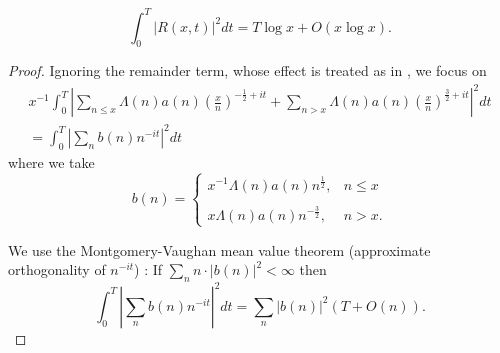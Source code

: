 \documentclass[12pt]{amsart}
\begin{document}
\begin{lem}
 \[
\int_0^T |R(x,t)|^2 dt = T \log x +O(x\log x). 
\]
\end{lem}
\begin{proof}
Ignoring the remainder term, whose effect is treated as in \cite{MontgomeryPC}, we focus on 
\begin{multline*}
x^{-1} \int_0^T \left|  \sum_{n\leq x} \Lambda(n)a(n) \left( \frac{x}{n} \right)^{-\frac 12+it} + \sum_{n>x} \Lambda(n) a(n) \left( \frac xn\right)^{\frac 32+it} \right|^2 dt
\\
=\int_0^T \left| \sum_n b(n) n^{-it} \right|^2 dt
\end{multline*}
where we take 
\begin{equation}\label{def of b(n)}
b(n) = \begin{cases} x^{-1} \Lambda(n)a(n)n^{\frac 12}, & n\leq x \\
\\
x  \Lambda(n)a(n) n^{-\frac 32 }, & n>x .
\end{cases}  
\end{equation} 


We use the Montgomery-Vaughan mean value theorem (approximate orthogonality of $n^{-it}$)  \cite[Corollary 3]{MVHilbert}: If $\sum_n  n\cdot |b(n)|^2   <\infty$  then 
\[
\int_0^T \left| \sum_n b(n) n^{-it} \right|^2 dt = \sum_n |b(n)|^2 \left( T+O\left( n \right) \right). 
\]


\end{proof}
\end{document}
